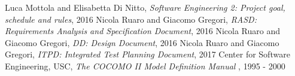 	Luca Mottola and Elisabetta Di Nitto, \emph{Software Engineering 2: Project goal, schedule and rules}, 2016
	Nicola Ruaro and Giacomo Gregori, \emph{RASD: Requirements Analysis and Specification Document}, 2016	
	Nicola Ruaro and Giacomo Gregori, \emph{DD: Design Document}, 2016	
	Nicola Ruaro and Giacomo Gregori, \emph{ITPD: Integrated Test Planning Document}, 2017	
	Center for Software Engineering, USC, \emph{The COCOMO II Model Definition Manual} , 1995 - 2000 